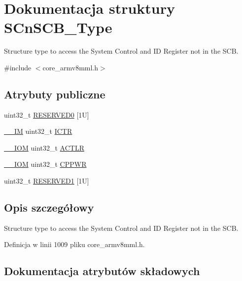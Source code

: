\hypertarget{struct_s_cn_s_c_b___type}{}\section{Dokumentacja struktury S\+Cn\+S\+C\+B\+\_\+\+Type}
\label{struct_s_cn_s_c_b___type}


Structure type to access the System Control and ID Register not in the S\+CB.  




{\ttfamily \#include $<$core\+\_\+armv8mml.\+h$>$}

\subsection*{Atrybuty publiczne}
\begin{DoxyCompactItemize}
\item 
uint32\+\_\+t \hyperlink{struct_s_cn_s_c_b___type_a758b3cae751b227e20698256b6249dd4}{R\+E\+S\+E\+R\+V\+E\+D0} \mbox{[}1\+U\mbox{]}
\item 
\hyperlink{core__sc300_8h_a4cc1649793116d7c2d8afce7a4ffce43}{\+\_\+\+\_\+\+IM} uint32\+\_\+t \hyperlink{struct_s_cn_s_c_b___type_a34ec1d771245eb9bd0e3ec9336949762}{I\+C\+TR}
\item 
\hyperlink{core__sc300_8h_ab6caba5853a60a17e8e04499b52bf691}{\+\_\+\+\_\+\+I\+OM} uint32\+\_\+t \hyperlink{struct_s_cn_s_c_b___type_a13af9b718dde7481f1c0344f00593c23}{A\+C\+T\+LR}
\item 
\hyperlink{core__sc300_8h_ab6caba5853a60a17e8e04499b52bf691}{\+\_\+\+\_\+\+I\+OM} uint32\+\_\+t \hyperlink{struct_s_cn_s_c_b___type_a356efebfcbdaecaf1176e6cd86a60bf1}{C\+P\+P\+WR}
\item 
uint32\+\_\+t \hyperlink{struct_s_cn_s_c_b___type_a0bce3f86e9f6e00085cf5a126ae201c6}{R\+E\+S\+E\+R\+V\+E\+D1} \mbox{[}1\+U\mbox{]}
\end{DoxyCompactItemize}


\subsection{Opis szczegółowy}
Structure type to access the System Control and ID Register not in the S\+CB. 

Definicja w linii 1009 pliku core\+\_\+armv8mml.\+h.



\subsection{Dokumentacja atrybutów składowych}
\mbox{\label{struct_s_cn_s_c_b___type_a13af9b718dde7481f1c0344f00593c23}} 
